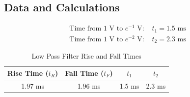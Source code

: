 \documentclass{article}
\begin{document}
\subsection{Data and Calculations}
\begin{align}
    \text{Time from 1 V to $e^{-1}$ V: }&t_1 = 1.5 \text{ ms}\label{eq:time1}\\
    \text{Time from 1 V to $e^{-2}$ V: }&t_2 = 2.3 \text{ ms}\label{eq:time2}
\end{align}
\begin{table}[h!]
    \centering
    \begin{tabular}{|c|c|c|c|}
        \hline
        Rise Time ($t_R$) & Fall Time ($t_F$) & $t_1$ & $t_2$\\
        \hline
        1.97 ms & 1.96 ms & 1.5 ms & 2.3 ms\\
        \hline
    \end{tabular}
    \caption{Low Pass Filter Rise and Fall Times}
    \label{tab:Low Pass Filter Times}
\end{table}
\end{document}
